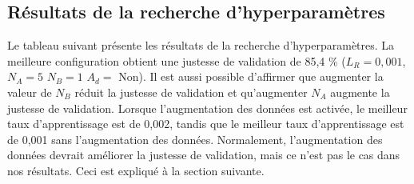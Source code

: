 \subsection{Résultats de la recherche d’hyperparamètres}
    Le tableau suivant présente les résultats de la recherche d'hyperparamètres. La meilleure configuration obtient une justesse de validation de 85,4 \% (\(L_R=0,001\), \(N_A=5\) \(N_B=1\) \(A_d =\) Non). Il est aussi possible d'affirmer que augmenter la valeur de \(N_B\) réduit la justesse de validation et qu'augmenter \(N_A\) augmente la justesse de validation. Lorsque l'augmentation des données est activée, le meilleur taux d'apprentissage est de 0,002, tandis que le meilleur taux d'apprentissage est de 0,001 sans l'augmentation des données. Normalement, l'augmentation des données devrait améliorer la justesse de validation, mais ce n'est pas le cas dans nos résultats. Ceci est expliqué à la section suivante.
    
